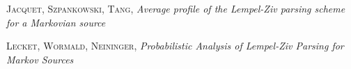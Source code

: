 
\versionAuteur

\def\changemargin#1#2{\list{}{\rightmargin#2\leftmargin#1}\item[]}
\let\endchangemargin=\endlist 





\separation
\bk



% 


\raggedbottom
\begin{thebibliography}{9}

        \textsc{Jacquet}, \textsc{Szpankowski}, \textsc{Tang},
        \textit{Average profile of the Lempel-Ziv parsing scheme for a Markovian source}

        \textsc{Lecket}, \textsc{Wormald}, \textsc{Neininger},
        \textit{Probabilistic Analysis of Lempel-Ziv Parsing for Markov Sources}

\end{thebibliography}

\pagebreak



